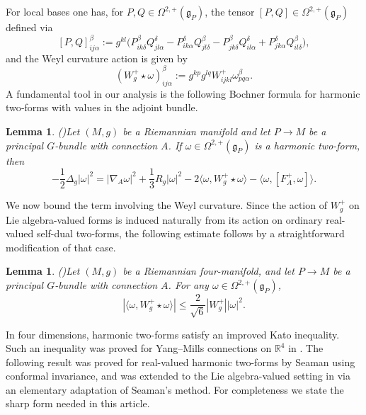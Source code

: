 \documentclass[12pt, twoside]{article}
\newtheorem{lemma}[theorem]{Lemma}
\theoremstyle{definition}
\numberwithin{equation}{section}
\def \De {\Delta}
\def\w {\omega}
\def\Om{\Omega}
\def\na {\nabla}
\begin{document}
For local bases one has, for $P,Q\in\Omega^{2,+}(\mathfrak{g}_{P})$, the tensor $[P,Q]\in\Omega^{2,+}(\mathfrak{g}_{P})$ defined via
\begin{equation}\label{E3}
[P,Q]^{\beta}_{ij\alpha}:=g^{kl}\bigl(P^{\beta}_{ik\delta}Q^{\delta}_{jl\alpha}-P^{\delta}_{ik\alpha}Q^{\beta}_{jl\delta}-P^{\beta}_{jk\delta}Q^{\delta}_{il\alpha}+P^{\delta}_{jk\alpha}Q^{\beta}_{il\delta}\bigr),
\end{equation}
and the Weyl curvature action is given by
\begin{equation*}
(W^{+}_{g}\star\omega)^{\beta}_{ij\alpha}:=g^{kp}g^{lq}W^{+}_{ijkl}\omega_{pq\alpha}^{\beta}.
\end{equation*}
A fundamental tool in our analysis is the following Bochner formula for harmonic two‑forms with values in the adjoint bundle.
\begin{lemma}(\cite[Theorem 3.10]{BL81})\label{L1}
Let $(M,g)$ be a Riemannian manifold and let $P\rightarrow M$ be a principal $G$-bundle with connection $A$.  
If $\w\in\Om^{2,+}(\mathfrak{g}_{P})$ is a harmonic two-form, then 
\begin{equation}\label{E2}
-\frac{1}{2}\De_{g}|\w|^{2}=|\na_{A}\w|^{2}+\frac{1}{3}R_{g}|\w|^{2}-2\langle\w,W_{g}^{+}\star \w\rangle-\langle\w,[F^{+}_{A},\w]\rangle.
\end{equation}
\end{lemma}
We now bound the term involving the Weyl curvature. Since the action of $W_{g}^{+}$ on Lie algebra-valued forms is induced naturally from its action on ordinary real-valued self-dual two-forms, the following estimate follows by a straightforward modification of that case.
\begin{lemma}(\cite[Lemma 2.2]{GKS18})\label{L2}
Let $(M,g)$ be a Riemannian four-manifold, and let $P\rightarrow M$ be a principal $G$-bundle with connection $A$. For any $\w\in\Om^{2,+}(\mathfrak{g}_{P})$,
\begin{equation}\label{E4}
|\langle\w,W_{g}^{+}\star \w\rangle|\leq\frac{2}{\sqrt{6}}|W^{+}_{g}||\w|^{2}.
\end{equation}
\end{lemma}
In four dimensions, harmonic two-forms satisfy an improved Kato inequality.
 Such an inequality was proved for Yang--Mills connections on $\mathbb{R}^{4}$ in \cite{Rad93}. 
 The following result was proved for real-valued harmonic two-forms by Seaman \cite{Sea91} using conformal invariance,
  and was extended to the Lie algebra-valued setting in \cite{GKS18} via an elementary adaptation of Seaman's method.
   For completeness we state the sharp form needed in this article.
\end{document}
